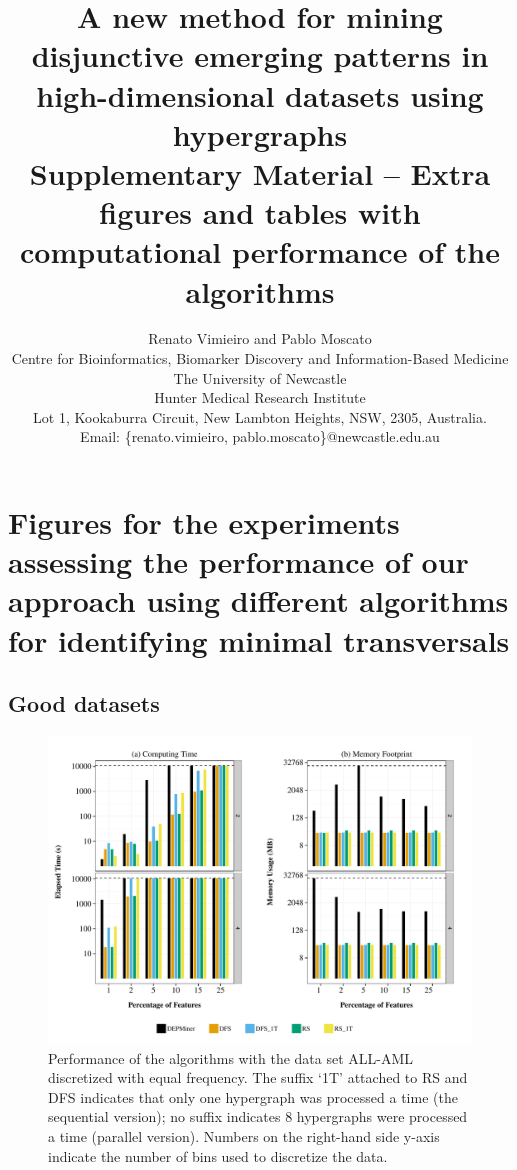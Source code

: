 \documentclass[12pt,a4paper]{article}
\title{A new method for mining disjunctive emerging patterns in high-dimensional datasets using hypergraphs\\[0.5cm]
\large Supplementary Material -- Extra figures and tables with computational performance of the algorithms}
\author{\small Renato Vimieiro and Pablo Moscato\\
\small Centre for Bioinformatics, Biomarker Discovery and Information-Based Medicine\\
\small The University of Newcastle\\
\small Hunter Medical Research Institute\\
\small Lot 1, Kookaburra Circuit, New Lambton Heights, NSW, 2305, Australia.\\ 
\small Email: \{renato.vimieiro, pablo.moscato\}@newcastle.edu.au
}
\date{}
\begin{document}
\maketitle

\appendix

\section*{Figures for the experiments assessing the performance of our approach using different algorithms 
for identifying minimal transversals}
\label{apsec:figperf}

\subsection*{Good datasets}

\begin{figure}[htb]
\begin{center}
\includegraphics[scale=0.65]{all_aml_ef}
\end{center}
\caption{Performance of the algorithms with the data set ALL-AML discretized with equal frequency.
The suffix `1T' attached to RS and DFS indicates that only one hypergraph was processed a time (the
sequential version); no suffix indicates 8 hypergraphs were processed a time (parallel version).
Numbers on the right-hand side y-axis indicate the number of bins used to discretize the data.}
\label{qcep:fig:allamlef}
\end{figure}
\end{document}
